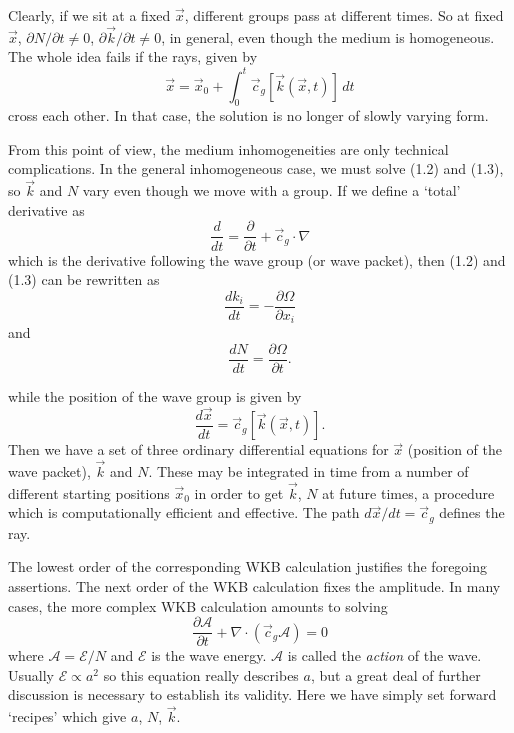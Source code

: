 \sourcepagebreak


Clearly, if we sit at a fixed $\vec{x}$, different groups pass at different times. So at
fixed $\vec{x}$, $\partial N/\partial t\ne0$, $\partial\vec{k}/\partial t\ne0$, in
general, even though the medium is homogeneous. The whole idea fails if the rays,
given by
\[
	\vec{x}=\vec{x}_0+
	\int_0^t\vec{c}_g[\vec{k}(\vec{x},t)]\,dt
\]
cross each other. In that case, the solution is no longer of slowly varying form.

From this point of view, the medium inhomogeneities are only technical complications.
In the general inhomogeneous case, we must solve (1.2) and (1.3), so $\vec{k}$ and $N$
vary even though we move with a group. If we define a `total' derivative as
\[
	\frac{d}{dt}=\frac{\partial}{\partial t}+\vec{c}_g\cdot\nabla
\]
which is the derivative following the wave group (or wave packet), then (1.2) and (1.3)
can be rewritten as
\[
	\frac{dk_i}{dt}=-\frac{\partial\Omega}{\partial x_i}
\]
and
\[
	\frac{dN}{dt}=\frac{\partial\Omega}{\partial t}.
\]

\sourcepagebreak

while the position of the wave group is given by
\[
	\frac{d\vec{x}}{dt}=\vec{c}_g[\vec{k}(\vec{x},t)].
\]
Then we have a set of three ordinary differential equations for $\vec{x}$ (position of
the wave packet), $\vec{k}$ and $N$. These may be integrated in time from a number of
different starting positions $\vec{x}_0$ in order to get $\vec{k}$, $N$ at future times,
a procedure which is computationally efficient and effective. The path
$d\vec{x}/dt=\vec{c}_g$ defines the ray.

The lowest order of the corresponding WKB calculation justifies the foregoing
assertions. The next order of the WKB calculation fixes the amplitude. In many cases,
the more complex WKB calculation amounts to solving
\[
	\frac{\partial\mathcal{A}}{\partial t}
	+\nabla\cdot(\vec{c}_g\mathcal{A})=0
\]
where $\mathcal{A}=\mathcal{E}/N$ and $\mathcal{E}$ is the wave energy. $\mathcal{A}$
is called the \emph{action} of the wave. Usually $\mathcal{E}\propto a^2$ so this
equation really describes $a$, but a great deal of further discussion is necessary to
establish its validity. Here we have simply set forward `recipes' which give $a$, $N$,
$\vec{k}$.
